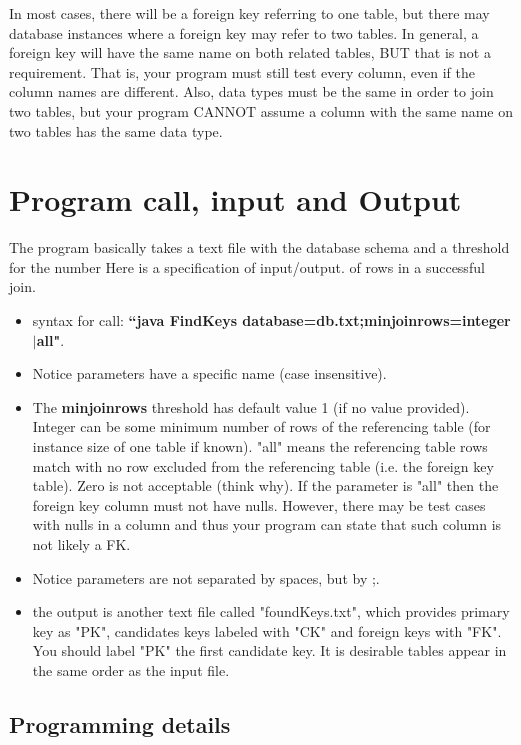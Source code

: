 In most cases, there will be a foreign key referring to one table, but there may
database instances where a foreign key may refer to two tables.
In general, a foreign key will have the same name on both related tables, BUT
that is not a requirement. That is, your program must still test every column,
even if the column names are different.
Also, data types must be the same in order to join two tables, but your program
CANNOT assume a column with the same name on two tables has the same data type.



\section{Program call, input and Output}

The program basically takes a text file with the database schema and a threshold for the number
Here is a specification of input/output.
of rows in a successful join.

\begin{itemize}
\item syntax for call:  {\bf ``java FindKeys database=db.txt;minjoinrows={integer$|$all}"}.
\item Notice parameters have a specific name (case insensitive).

\item The {\bf minjoinrows} threshold has default value 1 (if no value provided).
Integer can be some minimum number of rows of the referencing table 
 (for instance size of one table if known).
 "all" means the referencing table rows match with no row excluded
from the referencing table (i.e. the foreign key table).
Zero is not acceptable (think why).
If the parameter is "all" then the foreign key column must not have nulls. 
However, there may be test cases with nulls in a column 
 and thus your program can state that such column is not likely a FK.

\item
Notice parameters are not separated by spaces, but by ;.

\item the output is another text file called "foundKeys.txt", which provides
primary key as "PK",
candidates keys labeled with "CK" and foreign keys with "FK".
You should label "PK" the first candidate key.
It is desirable tables appear in the same order as the input file.
\end{itemize}


\subsection{Programming details}

